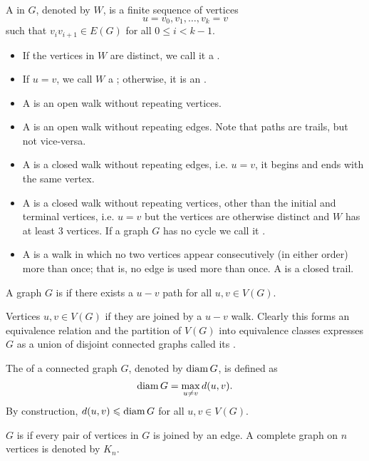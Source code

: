 \begin{definition}[Walk]
A  in $G$, denoted by $W$, is a finite sequence of vertices 
\[u=v_0,v_1,\dots,v_k=v\]
such that $v_i v_{i+1} \in E(G)$ for all $0 \le i < k-1$.
\begin{itemize}
\item If the vertices in $W$ are distinct, we call it a .
\item If $u=v$, we call $W$ a ; otherwise, it is an .
\item A  is an open walk without repeating vertices.
\item A  is an open walk without repeating edges. Note that paths are trails, but not vice-versa.
\item A  is a closed walk without repeating edges, i.e. $u=v$, it begins and ends with the same vertex.
\item A  is a closed walk without repeating vertices, other than the initial and terminal vertices, i.e. $u=v$ but the vertices are otherwise distinct and $W$ has at least 3 vertices. If a graph $G$ has no cycle we call it .
\item A  is a walk in which no two vertices appear consecutively (in either order) more than once; that is, no edge is used more than once. A  is a closed trail.
\end{itemize}
\end{definition}

\begin{definition}[Connectedness]
A graph $G$ is  if there exists a $u-v$ path for all $u,v\in V(G)$.

Vertices $u,v\in V(G)$  if they are joined by a $u-v$ walk. Clearly this forms an equivalence relation and the partition of $V(G)$ into equivalence classes expresses $G$ as a union of disjoint connected graphs called its .
\end{definition}

\begin{definition}[Diameter]
The  of a connected graph $G$, denoted by $\operatorname{diam} G$, is defined as
\[\operatorname{diam} G=\max_{u\neq v}d(u,v).\]
By construction, $d(u,v) \leqslant \operatorname{diam} G$ for all $u,v \in V(G)$.
\end{definition}

\begin{definition}
$G$ is  if every pair of vertices in $G$ is joined by an edge. A complete graph on $n$ vertices is denoted by $K_n$.
\end{definition}

